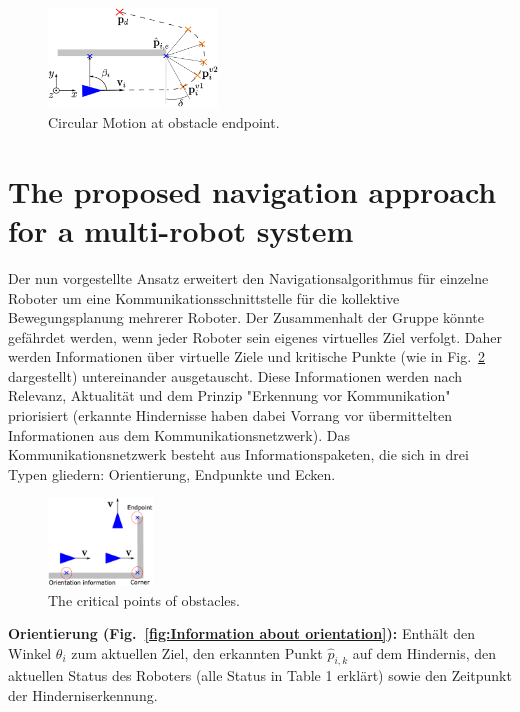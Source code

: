 \documentclass[conference]{IEEEtran}
\begin{document}
\begin{figure}[h]
    \centering
    \includegraphics[width=0.4\textwidth]{Pictures/Circular Motion at obstacle endpoint.png}
    \caption{Circular Motion at obstacle endpoint.}
    \label{fig:Circular Motion at obstacle endpoint}
\end{figure}


\section{The proposed navigation approach for a multi-robot system}
Der nun vorgestellte Ansatz erweitert den Navigationsalgorithmus für einzelne Roboter 
um eine Kommunikationsschnittstelle für die kollektive Bewegungsplanung mehrerer 
Roboter. Der Zusammenhalt der Gruppe könnte gefährdet werden, wenn jeder Roboter 
sein eigenes virtuelles Ziel verfolgt. Daher werden Informationen über virtuelle 
Ziele und kritische Punkte (wie in Fig.~\ref{fig:The critical points of obstacles} dargestellt) untereinander ausgetauscht. 
Diese Informationen werden nach Relevanz, Aktualität und dem Prinzip "Erkennung vor 
Kommunikation" priorisiert (erkannte Hindernisse haben dabei Vorrang vor übermittelten 
Informationen aus dem Kommunikationsnetzwerk).
Das Kommunikationsnetzwerk besteht aus Informationspaketen, die sich in drei Typen 
gliedern: Orientierung, Endpunkte und Ecken.

\begin{figure}[h]
    \centering
    \includegraphics[width=0.25\textwidth]{Pictures/The critical points of obstacles.png}
    \caption{The critical points of obstacles.}
    \label{fig:The critical points of obstacles}
\end{figure}

\textbf{Orientierung (Fig.~\ref{fig:Information about orientation}):} Enthält den Winkel \( \theta_i \) zum aktuellen Ziel, den erkannten 
Punkt \( \hat{p}_{i,k} \) auf dem Hindernis, den aktuellen Status des Roboters (alle Status in Table 1 erklärt) sowie den 
Zeitpunkt der Hinderniserkennung.
\end{document}
